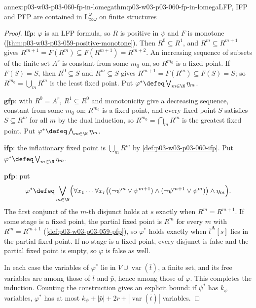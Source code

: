 \begin{annexitem}{annex:p03-w03-p03-060-fp-in-lomega}{thm:p03-w03-p03-060-fp-in-lomega}{LFP, IFP and PFP are contained in \(\mathrm{L}^\omega_{\infty\omega}\) on finite structures}
\begin{proof}
\(\mathbf{lfp}\): \(\varphi\) is an LFP formula, so \(R\) is positive in
\(\psi\) and \(F\) is monotone
(\cref{thm:p03-w03-p03-059-positive-monotone}). Then \(R^0\subseteq R^1\),
and \(R^m\subseteq R^{m+1}\) gives
\(R^{m+1}=F(R^m)\subseteq F(R^{m+1})=R^{m+2}\). An increasing sequence of
subsets of the finite set \(A^r\) is constant from some \(m_0\) on, so
\(R^{m_0}\) is a fixed point. If \(F(S)=S\), then \(R^0\subseteq S\) and
\(R^m\subseteq S\) gives \(R^{m+1}=F(R^m)\subseteq F(S)=S\); so
\(R^{m_0}=\bigcup_mR^m\) is the least fixed point. Put
\(\varphi^\ast\defeq\bigvee_{m\in\N}\eta_m\).

\(\mathbf{gfp}\): with \(R^0=A^r\), \(R^1\subseteq R^0\) and monotonicity
give a decreasing sequence, constant from some \(m_0\) on; \(R^{m_0}\) is a
fixed point, and every fixed point \(S\) satisfies \(S\subseteq R^m\) for
all \(m\) by the dual induction, so \(R^{m_0}=\bigcap_mR^m\) is the
greatest fixed point. Put \(\varphi^\ast\defeq\bigwedge_{m\in\N}\eta_m\).

\(\mathbf{ifp}\): the inflationary fixed point is \(\bigcup_mR^m\) by
\cref{def:p03-w03-p03-060-ifp}. Put \(\varphi^\ast\defeq\bigvee_{m\in\N}\eta_m\).

\(\mathbf{pfp}\): put
\[
 \varphi^\ast\defeq\bigvee_{m\in\N}\Bigl(\forall x_1\cdots\forall x_r
 \bigl((\neg\psi^m\vee\psi^{m+1})\wedge(\neg\psi^{m+1}\vee\psi^m)\bigr)\wedge\eta_m\Bigr).
\]
The first conjunct of the \(m\)-th disjunct holds at \(s\) exactly when
\(R^m=R^{m+1}\). If some stage is a fixed point, the partial fixed point is
\(R^m\) for every \(m\) with \(R^m=R^{m+1}\)
(\cref{def:p03-w03-p03-059-pfp}), so \(\varphi^\ast\) holds exactly when
\(\bar t^{\mathbf A}[s]\) lies in the partial fixed point. If no stage is a
fixed point, every disjunct is false and the partial fixed point is empty,
so \(\varphi\) is false as well.

In each case the variables of \(\varphi^\ast\) lie in
\(V\cup\operatorname{var}(\bar t)\), a finite set, and its free variables
are among those of \(\bar t\) and \(\bar p\), hence among those of
\(\varphi\). This completes the induction. Counting the construction gives
an explicit bound: if \(\psi^\ast\) has \(k_\psi\) variables, \(\varphi^\ast\)
has at most \(k_\psi+|\bar p|+2r+|\operatorname{var}(\bar t)|\) variables.
\end{proof}
\end{annexitem}

